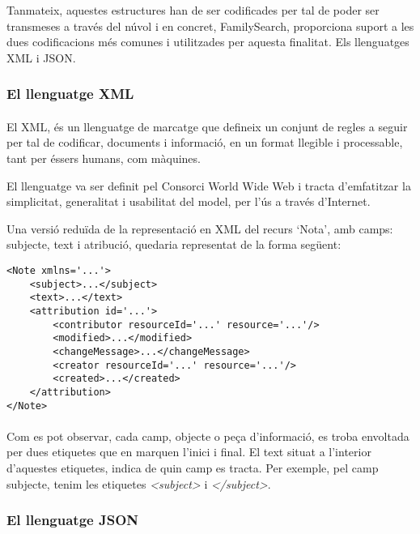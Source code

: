         Tanmateix, aquestes estructures han de ser codificades per tal de poder ser transmeses a través del núvol i en concret, FamilySearch, proporciona suport a les dues codificacions més comunes i utilitzades per aquesta finalitat. Els llenguatges XML i JSON.


        \subsubsection{El llenguatge XML}

        \paragraph{}
        El \gls{XML}, és un llenguatge de marcatge que defineix un conjunt de regles a seguir per tal de codificar, documents i informació, en un format llegible i processable, tant per éssers humans, com màquines.

        El llenguatge va ser definit pel Consorci World Wide Web i tracta d’emfatitzar la simplicitat, generalitat i usabilitat del model, per l'ús a través d'Internet.

        Una versió reduïda de la representació en XML del recurs ‘Nota’, amb camps: subjecte, text i atribució, quedaria representat de la forma següent:

        \begin{lstlisting}[style=rawOwn,caption={Representació bàsica en XML d'una Nota}]
<Note xmlns='...'>
    <subject>...</subject>
    <text>...</text>
    <attribution id='...'>
        <contributor resourceId='...' resource='...'/>
        <modified>...</modified>
        <changeMessage>...</changeMessage>
        <creator resourceId='...' resource='...'/>
        <created>...</created>
    </attribution>
</Note>
        \end{lstlisting}

        \paragraph{}
        Com es pot observar, cada camp, objecte o peça d'informació, es troba envoltada per dues etiquetes que en marquen l'inici i final. El text situat a l'interior d'aquestes etiquetes, indica de quin camp es tracta. Per exemple, pel camp subjecte, tenim les etiquetes \emph{<subject>} i \emph{</subject>}.


        \subsubsection{El llenguatge JSON}

